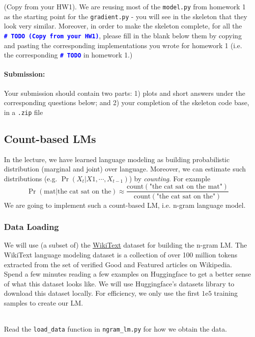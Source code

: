 \noindent \todo{} (Copy from your HW1). We are reusing most of the \texttt{model.py} from homework 1 as the starting point for the \texttt{gradient.py} - you will see in the skeleton that they look very similar. Moreover, in order to make the skeleton complete, for all the \textcolor{blue}{\texttt{\textbf{\#~TODO (Copy from your HW1)}}}, please fill in the blank below them by copying and pasting the corresponding implementations you wrote for homework 1 (i.e. the corresponding \textcolor{blue}{\texttt{\textbf{\#~TODO}}} in homework 1.)

\noindent \paragraph{Submission:} Your submission should contain two parts: 1) plots and short answers under the corresponding questions below; and 2) your completion of the skeleton code base, in a \texttt{.zip} file

\subsection{Count-based LMs}
\label{subsubsec:count-based lms}
In the lecture, we have learned language modeling as building probabilistic distribution (marginal and joint) over language. Moreover, we can estimate such distributions (e.g. $\Pr(X_t|X1, \cdots, X_{t-1})$) by \textit{counting}. For example $$\Pr(\textrm{mat} | \textrm{the cat sat on the}) \approx \frac{\textrm{count}(\textrm{"the cat sat on the mat"})}{\textrm{count}(\textrm{"the cat sat on the"})} $$
We are going to implement such a count-based LM, i.e. n-gram language model.

\subsubsection{Data Loading}
We will use (a subset of) the \href{https://huggingface.co/datasets/wikitext}{WikiText} dataset for building the n-gram LM. The WikiText language modeling dataset is a collection of over 100 million tokens extracted from the set of verified Good and Featured articles on Wikipedia. 
Spend a few minutes reading a few examples on Huggingface to get a better sense of what this dataset looks like. We will use Huggingface's datasets library to download this dataset locally. For efficiency, we only use the first $1\textrm{e}5$ training samples to create our LM.\\\

\noindent Read the \texttt{load\_data} function in \texttt{ngram\_lm.py} for how we obtain the data.

